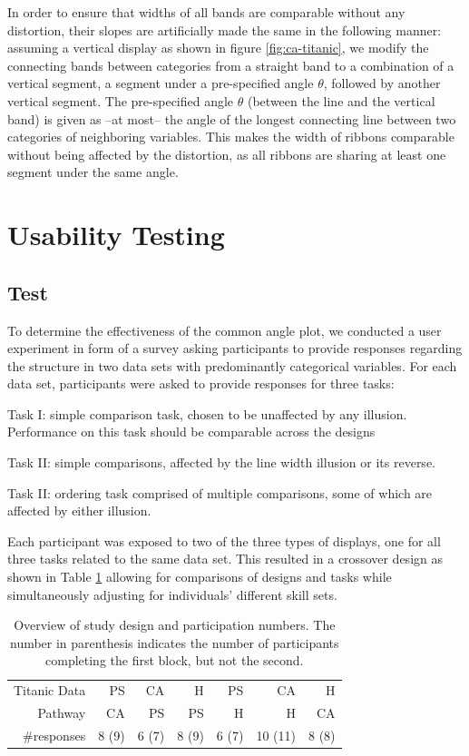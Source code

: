 In order to ensure that  widths of all bands are  comparable without any distortion, their slopes  are artificially made the same in the following manner: 
assuming a vertical display as shown in figure \ref{fig:ca-titanic}, we modify  the connecting bands between  categories from a straight band  to a combination of a vertical  segment, a  segment under a pre-specified angle $\theta$, followed by another vertical  segment.  
The pre-specified angle $\theta$ (between the line and the vertical band) is given as --at most-- the angle of the longest connecting line between two categories of neighboring variables. 
This makes the width of ribbons  comparable without being affected by the distortion, as all ribbons are sharing at least one segment under the same angle. 


\section{Usability Testing}
\subsection{Test}

To determine the effectiveness of the common angle plot, we conducted a user experiment in form of a survey asking participants to provide responses regarding the structure in two data sets with predominantly categorical variables.
For each data set, participants were asked to provide responses for three tasks:

Task I: simple comparison task, chosen to be unaffected by any illusion. Performance on this task should be comparable across the designs

Task II: simple comparisons, affected by the line width illusion or its reverse. 

Task II: ordering task comprised of multiple comparisons, some of which are affected by either illusion.
  
Each participant was exposed to two of the three types of displays, one for all three tasks related to the same data set.
This resulted in a crossover design as shown in Table \ref{tab:designs} allowing for comparisons of designs and tasks while  simultaneously adjusting for individuals' different skill sets.

\begin{table}[htbp]
\centering
\begin{tabular}{rrrrrrr}
Titanic Data & PS & CA & H & PS & CA & H \\ 
Pathway & CA & PS & PS & H& H & CA \\ \hline
\#responses &  8 (9) &  6 (7) &  8 (9) &  6 (7) & 10 (11) & 8 (8)\\ 
\end{tabular}
\caption{\label{tab:designs} Overview of study design and participation numbers. The number in parenthesis indicates the number of participants completing the first block, but not the second.}
\end{table}


